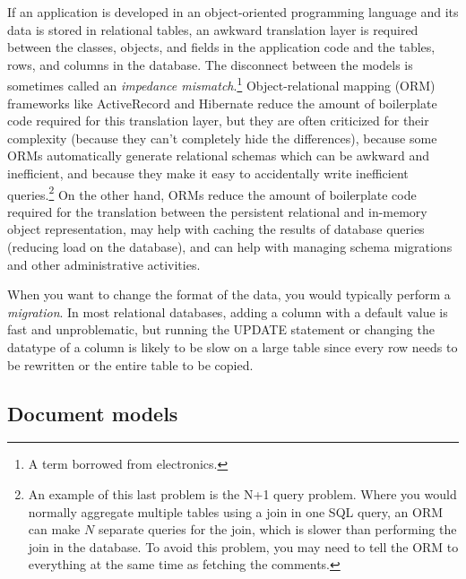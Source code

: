\documentclass[table, xcdraw]{article}%
\begin{document}
If an application is developed in an object-oriented programming language and its data is stored in relational tables, an awkward translation layer is required between the classes, objects, and fields in the application code and the tables, rows, and columns in the database. The disconnect between the models is sometimes called an \textit{impedance mismatch}.\footnote{A term borrowed from electronics.} Object-relational mapping (ORM) frameworks like ActiveRecord and Hibernate reduce the amount of boilerplate code required for this translation layer, but they are often criticized for their complexity (because they can’t completely hide the differences), because some ORMs automatically generate relational schemas which can be awkward and inefficient, and because they make it easy to accidentally write inefficient queries.\footnote{An example of this last problem is the N+1 query problem. Where you would normally aggregate multiple tables using a join in one SQL query, an ORM can make $N$ separate queries for the join, which is slower than performing the join in the database. To avoid this problem, you may need to tell the ORM to everything at the same time as fetching the comments.} On the other hand, ORMs reduce the amount of boilerplate code required for the translation between the persistent relational and in-memory object representation, may help with caching the results of database queries (reducing load on the database), and can help with managing schema migrations and other administrative activities.

When you want to change the format of the data, you would typically perform a \textit{migration}. In most relational databases, adding a column with a default value is fast and unproblematic, but running the UPDATE statement or changing the datatype of a column is likely to be slow on a large table since every row needs to be rewritten or the entire table to be copied.

\subsection{Document models}
\end{document}
